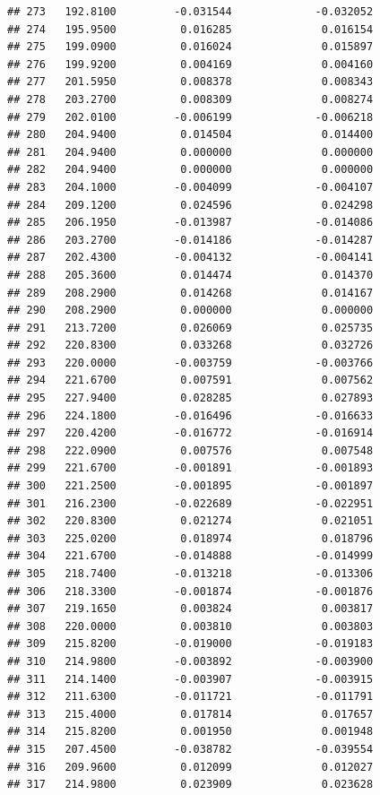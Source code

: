 \documentclass[
]{article}
\begin{document}
\begin{verbatim}
## 273   192.8100         -0.031544             -0.032052
## 274   195.9500          0.016285              0.016154
## 275   199.0900          0.016024              0.015897
## 276   199.9200          0.004169              0.004160
## 277   201.5950          0.008378              0.008343
## 278   203.2700          0.008309              0.008274
## 279   202.0100         -0.006199             -0.006218
## 280   204.9400          0.014504              0.014400
## 281   204.9400          0.000000              0.000000
## 282   204.9400          0.000000              0.000000
## 283   204.1000         -0.004099             -0.004107
## 284   209.1200          0.024596              0.024298
## 285   206.1950         -0.013987             -0.014086
## 286   203.2700         -0.014186             -0.014287
## 287   202.4300         -0.004132             -0.004141
## 288   205.3600          0.014474              0.014370
## 289   208.2900          0.014268              0.014167
## 290   208.2900          0.000000              0.000000
## 291   213.7200          0.026069              0.025735
## 292   220.8300          0.033268              0.032726
## 293   220.0000         -0.003759             -0.003766
## 294   221.6700          0.007591              0.007562
## 295   227.9400          0.028285              0.027893
## 296   224.1800         -0.016496             -0.016633
## 297   220.4200         -0.016772             -0.016914
## 298   222.0900          0.007576              0.007548
## 299   221.6700         -0.001891             -0.001893
## 300   221.2500         -0.001895             -0.001897
## 301   216.2300         -0.022689             -0.022951
## 302   220.8300          0.021274              0.021051
## 303   225.0200          0.018974              0.018796
## 304   221.6700         -0.014888             -0.014999
## 305   218.7400         -0.013218             -0.013306
## 306   218.3300         -0.001874             -0.001876
## 307   219.1650          0.003824              0.003817
## 308   220.0000          0.003810              0.003803
## 309   215.8200         -0.019000             -0.019183
## 310   214.9800         -0.003892             -0.003900
## 311   214.1400         -0.003907             -0.003915
## 312   211.6300         -0.011721             -0.011791
## 313   215.4000          0.017814              0.017657
## 314   215.8200          0.001950              0.001948
## 315   207.4500         -0.038782             -0.039554
## 316   209.9600          0.012099              0.012027
## 317   214.9800          0.023909              0.023628

\end{verbatim}
\end{document}

